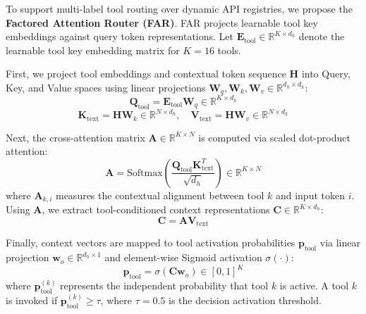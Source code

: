 \documentclass[letterpaper]{article} %
\begin{document}
To support multi-label tool routing over dynamic API registries, we propose the \textbf{Factored Attention Router (FAR)}. FAR projects learnable tool key embeddings against query token representations. Let $\mathbf{E}_{\text{tool}} \in \mathbb{R}^{K \times d_h}$ denote the learnable tool key embedding matrix for $K=16$ tools.

First, we project tool embeddings and contextual token sequence $\mathbf{H}$ into Query, Key, and Value spaces using linear projections $\mathbf{W}_q, \mathbf{W}_k, \mathbf{W}_v \in \mathbb{R}^{d_h \times d_h}$:
\begin{equation}
    \mathbf{Q}_{\text{tool}} = \mathbf{E}_{\text{tool}} \mathbf{W}_q \in \mathbb{R}^{K \times d_h}
\end{equation}
\begin{equation}
    \mathbf{K}_{\text{text}} = \mathbf{H} \mathbf{W}_k \in \mathbb{R}^{N \times d_h}, \quad \mathbf{V}_{\text{text}} = \mathbf{H} \mathbf{W}_v \in \mathbb{R}^{N \times d_h}
\end{equation}

Next, the cross-attention matrix $\mathbf{A} \in \mathbb{R}^{K \times N}$ is computed via scaled dot-product attention:
\begin{equation}
    \mathbf{A} = \text{Softmax}\left( \frac{\mathbf{Q}_{\text{tool}} \mathbf{K}_{\text{text}}^T}{\sqrt{d_h}} \right) \in \mathbb{R}^{K \times N}
\end{equation}
where $\mathbf{A}_{k, i}$ measures the contextual alignment between tool $k$ and input token $i$. Using $\mathbf{A}$, we extract tool-conditioned context representations $\mathbf{C} \in \mathbb{R}^{K \times d_h}$:
\begin{equation}
    \mathbf{C} = \mathbf{A} \mathbf{V}_{\text{text}}
\end{equation}

Finally, context vectors are mapped to tool activation probabilities $\mathbf{p}_{\text{tool}}$ via linear projection $\mathbf{w}_o \in \mathbb{R}^{d_h \times 1}$ and element-wise Sigmoid activation $\sigma(\cdot)$:
\begin{equation}
    \mathbf{p}_{\text{tool}} = \sigma \left( \mathbf{C} \mathbf{w}_o \right) \in [0, 1]^K
\end{equation}
where $\mathbf{p}_{\text{tool}}^{(k)}$ represents the independent probability that tool $k$ is active. A tool $k$ is invoked if $\mathbf{p}_{\text{tool}}^{(k)} \ge \tau$, where $\tau = 0.5$ is the decision activation threshold.
\end{document}
